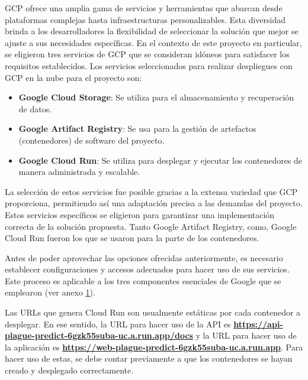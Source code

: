 \newpage

GCP ofrece una amplia gama de servicios y herramientas que abarcan desde plataformas complejas hasta infraestructuras personalizables. Esta diversidad brinda a los desarrolladores la flexibilidad de seleccionar la solución que mejor se ajuste a sus necesidades específicas. En el contexto de este proyecto en particular, se eligieron tres servicios de GCP que se consideran idóneos para satisfacer los requisitos establecidos. Los servicios seleccionados para realizar despliegues con GCP en la nube para el proyecto son:

\begin{itemize}
	\item \textbf{Google Cloud Storage}: Se utiliza para el almacenamiento y recuperación de datos.
	\item \textbf{Google Artifact Registry}: Se usa para la gestión de artefactos (contenedores) de software del proyecto.
	\item \textbf{Google Cloud Run}: Se utiliza para desplegar y ejecutar los contenedores de manera administrada y escalable.
\end{itemize}

La selección de estos servicios fue posible gracias a la extensa variedad que GCP proporciona, permitiendo así una adaptación precisa a las demandas del proyecto. Estos servicios específicos se eligieron para garantizar una implementación correcta de la solución propuesta. Tanto Google Artifact Registry, como, Google Cloud Run fueron los que se usaron para la parte de los contenedores. \newline

Antes de poder aprovechar las opciones ofrecidas anteriormente, es necesario establecer configuraciones y accesos adecuados para hacer uso de sus servicios. Este proceso es aplicable a los tres componentes esenciales de Google que se emplearon (ver anexo \href{https://drive.google.com/file/d/1DbWHxnWBgaB8Tp3J8hLYelR91bEdglr-/view?usp=drive_link}{1}). \newline

Las URLs que genera Cloud Run son usualmente estáticas por cada contenedor a desplegar. En ese sentido, la URL para hacer uso de la API es \href{https://api-plague-predict-6gzk55suba-uc.a.run.app/docs}{\textbf{https://api-plague-predict-6gzk55suba-uc.a.run.app/docs}} y la URL para hacer uso de la aplicación es \href{https://web-plague-predict-6gzk55suba-uc.a.run.app}{\textbf{https://web-plague-predict-6gzk55suba-uc.a.run.app}}. Para hacer uso de estas, se debe contar previamente a que los contenedores se hayan creado y desplegado correctamente. \newline

